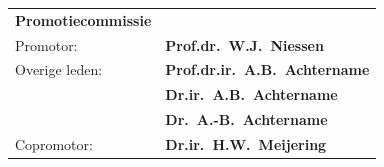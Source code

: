 \newpage
\thispagestyle{empty}
\label{othersideformal}

\begin{tabular}{@{}ll@{}}
\large\bf{Promotiecommissie} &\\ [8ex]
Promotor:    & {\bf Prof.dr.~W.J.~Niessen}\\[3ex]
Overige leden: & {\bf Prof.dr.ir.~A.B.~Achtername}\\[1ex]
&{\bf Dr.ir.~A.B.~Achtername}\\[1ex]
&{\bf Dr.~A.-B.~Achtername}\\[3ex]
Copromotor: & {\bf Dr.ir.~H.W.~Meijering}\\
\end{tabular}





\setlength{\parindent}{\myindent}


